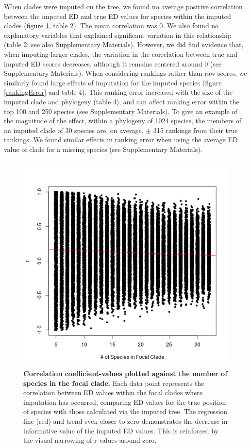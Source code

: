 \documentclass[12pt,english]{article}
\begin{document}
When clades were imputed on the tree, we found no average positive correlation
between the imputed ED and true ED values for species within the imputed clades
(figure \ref{imputationTrend}, table 2). The mean correlation was 0.
We also found no explanatory variables that explained significant variation in
this relationship (table 2; see also Supplementary Materials). However, we did
find evidence that, when imputing larger clades, the variation in the
correlation between true and imputed ED scores decreases, although it remains
centered around 0 (see Supplementary Materials). When considering rankings
rather than raw scores, we similarly found large effects of imputation for the
imputed species (figure \ref{rankingError} and table 4). This ranking error
increased with the size of the imputed clade and phylogeny (table 4), and can
affect ranking error within the top 100 and 250 species (see Supplementary
Materials). To give an example of the magnitude of the effect, within a
phylogeny of 1024 species, the members of an imputed clade of 30 species are, on
average, $\pm$ 315 rankings from their true rankings.
We found similar effects in ranking error when using the average
ED value of clade for a missing species (see Supplementary Materials).

\begin{figure}[!ht]
  \center
  \includegraphics[width=.5\textwidth]{edModel.png}
  \caption{\textbf{Correlation coefficient-values plotted against the number of
  species in the focal clade.} Each data point  represents the correlation
  between ED values within the focal clades where imputation has occurred,
  comparing ED values for the true position of species with those calculated via
  the imputed tree. The regression line (red) and trend even closer to zero
  demonstrates the decrease in informative value of the imputed ED values. This
  is reinforced by the visual narrowing of r-values around zero.}
  \label{imputationTrend}
\end{figure}
\end{document}
